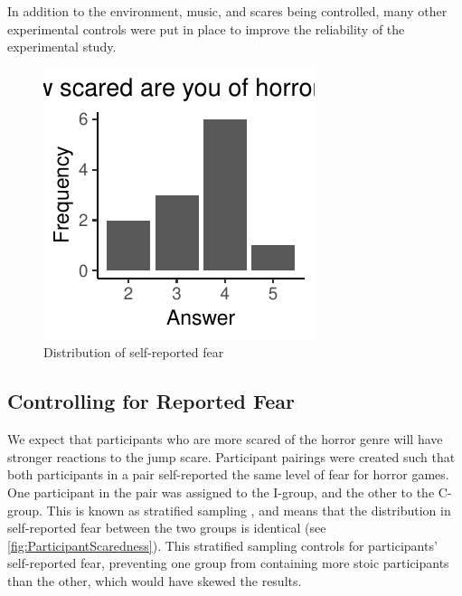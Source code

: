 \documentclass[12pt,a4paper]{article}\usepackage[]{graphicx}\usepackage[]{color}
\makeatletter
\def\maxwidth{ %
  \ifdim\Gin@nat@width>\linewidth
    \linewidth
  \else
    \Gin@nat@width
  \fi
}
\makeatother
\begin{document}
In addition to the environment, music, and scares being controlled, many other experimental controls were put in place to improve the reliability of the experimental study.

\begin{figure}
	\vspace{-10pt}


{\centering \includegraphics[width=\maxwidth]{figure/ParticipantScaredness-1} 

}



	\caption{Distribution of self-reported fear}
	\label{fig:ParticipantScaredness}
\end{figure}

\subsection{Controlling for Reported Fear}

We expect that participants who are more scared of the horror genre will have stronger reactions to the jump scare.
Participant pairings were created such that both participants in a pair self-reported the same level of fear for horror games.
One participant in the pair was assigned to the I-group, and the other to the C-group.
This is known as stratified sampling \citep[p. 178]{stratification}, and means that the distribution in self-reported fear between the two groups is identical (see \vref{fig:ParticipantScaredness}).
This stratified sampling controls for participants' self-reported fear, preventing one group from containing more stoic participants than the other, which would have skewed the results.
\end{document}
